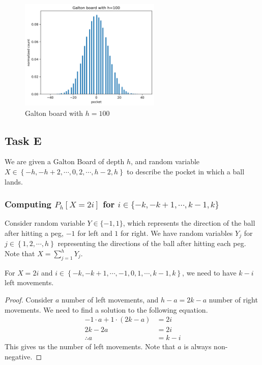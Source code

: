 \begin{figure}[H]
	\centering
	\includegraphics[width=0.6\textwidth]{images/2d3.png}
	\caption{Galton board with $h=100$}
\end{figure}

\subsection*{Task E}
We are given a Galton Board of depth $h$, and random variable $X\in \left\{-h,-h+2,\cdots,0,2,\cdots,h-2,h\right\}$ to describe the pocket in which a ball lands.

\subsubsection*{Computing $P_h[X=2i]$ \normalfont for $i\in\{-k,-k+1,\cdots,k-1,k\}$}
Consider random variable $Y \in \{-1,1\}$, which represents the direction of the ball after hitting a peg, $-1$ for left and $1$ for right.
We have random variables $Y_j$ for $j\in\left\{1,2,\cdots,h\right\}$ representing the directions of the ball after hitting each peg.
Note that $X = \sum_{j=1}^{h}Y_j$.\\

\begin{claim}
	For $X=2i$ and $i \in \left\{-k,-k+1,\cdots, -1,0,1,\cdots,k-1,k\right\}$, we need to have $k - i$ left movements.
\end{claim}
\begin{proof}
	Consider $a$ number of left movements, and $h-a=2k-a$ number of right movements.
	We need to find a solution to the following equation.
	\begin{align*}
		-1 \cdot a + 1 \cdot (2k-a) & = 2i    \\
		2k - 2a                     & = 2i    \\
		\therefore    a             & = k - i
	\end{align*}
	This gives us the number of left movements. Note that $a$ is always non-negative.
\end{proof}

